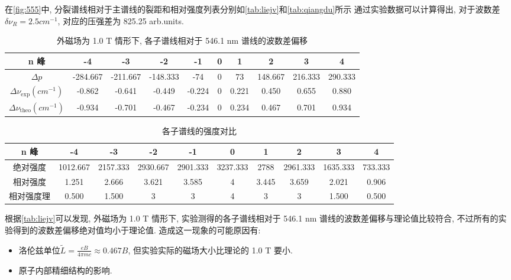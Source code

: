 \documentclass[font=default]{mpltx}
\begin{document}
在\autoref{fig:555}中, 分裂谱线相对于主谱线的裂距和相对强度列表分别如\autoref{tab:liejv}和\autoref{tab:qiangdu}所示
通过实验数据可以计算得出, 对于波数差$\delta \nu_R = 2.5 cm^{-1}$, 对应的压强差为 825.25 arb.units.


\begin{table}[htbp]
  \centering
  \caption{外磁场为 1.0 T 情形下, 各子谱线相对于 546.1 nm 谱线的波数差偏移}
  \begin{tabular}{c|ccccccccc}
    \hline
    n 峰 & -4 & -3 & -2 & -1 & 0 & 1 & 2 & 3 & 4 \\
    \hline
    $\Delta p$ & -284.667 & -211.667 & -148.333 & -74 & 0 & 73 & 148.667 & 216.333 & 290.333 \\
    \hline
    $\Delta \nu_{\text{exp}} (cm^{-1})$ & -0.862 & -0.641 & -0.449 & -0.224 & 0 & 0.221 & 0.450 & 0.655 & 0.880 \\
    \hline
    $\Delta \nu_{\text{theo}} (cm^{-1})$ & -0.934 & -0.701 & -0.467 & -0.234 & 0 & 0.234 & 0.467 & 0.701 & 0.934 \\
    \hline
  \end{tabular}
  \label{tab:liejv}
\end{table}

\begin{table}[htbp]
  \centering
  \caption{各子谱线的强度对比}
  \begin{tabular}{c|ccccccccc}
    \hline
    n 峰 & -4 & -3 & -2 & -1 & 0 & 1 & 2 & 3 & 4 \\
    \hline
    绝对强度 & 1012.667 & 2157.333 & 2930.667 & 2901.333 & 3237.333 & 2788 & 2961.333 & 1635.333 & 733.333 \\
    \hline
    相对强度 & 1.251 & 2.666 & 3.621 & 3.585 & 4 & 3.445 & 3.659 & 2.021 & 0.906 \\
    \hline
    相对强度理 & 0.500 & 1.500 & 3 & 3 & 4 & 3 & 3 & 1.500 & 0.500 \\
    \hline
  \end{tabular}
  \label{tab:qiangdu}
\end{table}

根据\autoref{tab:liejv}可以发现, 外磁场为 1.0 T 情形下, 
实验测得的各子谱线相对于 546.1 nm 谱线的波数差偏移与理论值比较符合, 不过所有的实验得到的波数差偏移绝对值均小于理论值.
造成这一现象的可能原因有:
\begin{itemize}
  \item 洛伦兹单位$\tilde{L} = \frac{eB}{4\pi mc} \approx 0.467B$, 但实验实际的磁场大小比理论的 1.0 T 要小.
  \item 原子内部精细结构的影响.
\end{itemize}
\end{document}

